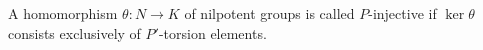 A homomorphism $\theta: N \to K$ of nilpotent groups is called $P$-injective if $\ker \theta$ consists exclusively of $P'$-torsion elements.
